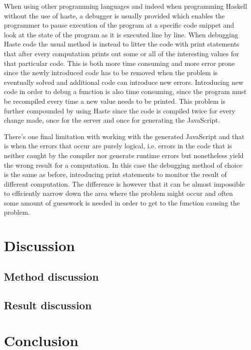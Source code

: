 \documentclass[a4paper]{article}
\begin{document}
When using other programming languages and indeed when programming Haskell without the use of haste, a debugger is usually provided which enables the programmer to pause execution of the program at a specific code snippet and look at the state of the program as it is executed line by line. When debugging Haste code the usual method is instead to litter the code with print statements that after every computation prints out some or all of the interesting values for that particular code. This is both more time consuming and more error prone since the newly introduced code has to be removed when the problem is eventually solved and additional code can introduce new errors. Introducing new code in order to debug a function is also time consuming, since the program must be recompiled every time a new value needs to be printed. This problem is further compounded by using Haste since the code is compiled twice for every change made, once for the server and once for generating the JavaScript.

There's one final limitation with working with the generated JavaScript and that is when the errors that occur are purely logical, i.e. errors in the code that is neither caught by the compiler nor generate runtime errors but nonetheless yield the wrong result for a computation. In this case the debugging method of choice is the same as before, introducing print statements to monitor the result of different computation. The difference is however that it can be almost impossible to efficiently narrow down the area where the problem might occur and often some amount of guesswork is needed in order to get to the function causing the problem. 


\section{Discussion}
\subsection{Method discussion}
\subsection{Result discussion}

\section{Conclusion}
\end{document}

